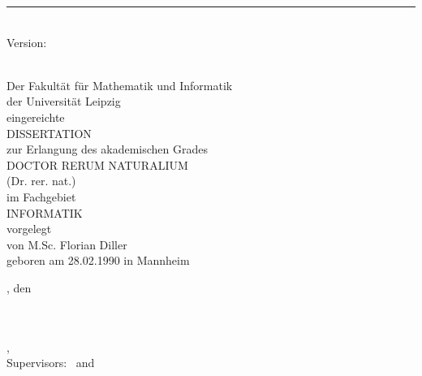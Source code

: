 %
\begin{titlepage}
	\flushright
	\hfill
	\vfill
	{\LARGE\thesisTitle \par}
	\rule[5pt]{\textwidth}{.4pt} \par
	{\Large\thesisName}
	\vfill
	\textit{\large\thesisDate} \\
	Version: \thesisVersion
\end{titlepage}



\begin{titlepage}
	\tgherosfont
	\centering

	\vfill
	\vspace*{15mm}
	{\huge \color{ctcolortitle}\textbf{\thesisTitle} \\[10mm]}
	{\Large Der Fakultät für Mathematik und Informatik}\\
	{\Large der Universität Leipzig}\\
	{\Large eingereichte}\\[10mm]
	{\Large DISSERTATION}\\[10mm]
	{\Large zur Erlangung des akademischen Grades}\\[7mm]
	{\Large DOCTOR RERUM NATURALIUM}\\
	{\Large (Dr. rer. nat.)}\\[7mm]
	{\Large im Fachgebiet}\\[7mm]
	{\Large INFORMATIK}\\[7mm]
	{\Large vorgelegt}\\[10mm]
	{\Large von M.Sc. Florian Diller}\\
	{\Large geboren am 28.02.1990 in Mannheim}\\[20mm]
	\raggedright
	{\Large \thesisUniversityCity, den \thesisDate}


\end{titlepage}


\hfill
\vfill
{
	\small
	\textbf{\thesisName} \\
	\textit{\thesisTitle} \\
	\thesisSubject, \thesisDate \\
	Supervisors: \thesisFirstSupervisor\ and \thesisSecondSupervisor \\[1.5em]
	\textbf{\thesisUniversity} \\
	\textit{\thesisUniversityGroup} \\
	\thesisUniversityDepartment \\
	\thesisUniversityStreetAddress \\
	\thesisUniversityPostalCode\ \thesisUniversityCity
}
